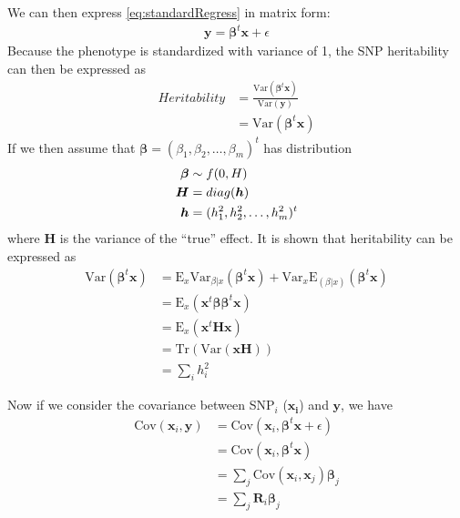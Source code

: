 			We can then express \cref{eq:standardRegress} in matrix form:
			\begin{align}
				\boldsymbol{y}=\boldsymbol{\beta}^t\boldsymbol{x}+\epsilon
				\label{eq:matrixRegress}
			\end{align}
			Because the phenotype is standardized with variance of 1, the \gls{SNP} heritability can then be expressed as
			\begin{align}
				Heritability& = \frac{\mathrm{Var}(\boldsymbol{\beta}^t\boldsymbol{x})}{\mathrm{Var}(\boldsymbol{y})} \nonumber\\
				&=\mathrm{Var}(\boldsymbol{\beta}^t\boldsymbol{x})
			\end{align}
			If we then assume that $\boldsymbol{\beta} = (\beta_1, \beta_2,\dots,\beta_m)^t$ has distribution
			\begin{align*}
				\boldsymbol{\beta}&\sim f(0,\boldmath{H})\\
				\boldsymbol{H}&=diag(\boldsymbol{h})\\
				\boldsymbol{h}&=(h_1^2,h_2^2,\dots,h_m^2)^t
			\end{align*}
			where $\boldsymbol{H}$ is the variance of the ``true'' effect. 
			It is shown that heritability can be expressed as %
			\begin{align}
			\mathrm{Var}(\boldsymbol{\beta}^t\boldsymbol{x}) &= \mathrm{E}_x\mathrm{Var}_{\beta|x}(\boldsymbol{\beta}^t\boldsymbol{x})+\mathrm{Var}_x\mathrm{E}_{(\beta|x)}(\boldsymbol{\beta}^t\boldsymbol{x}) \nonumber\\
			&=\mathrm{E}_x(\boldsymbol{x}^t\boldsymbol{\beta\beta}^t\boldsymbol{x}) \nonumber\\ 
			&= \mathrm{E}_x(\boldsymbol{x}^t\boldsymbol{Hx}) \nonumber\\
			&=\mathrm{Tr}(\mathrm{Var}(\boldsymbol{x}\boldsymbol{H})) \nonumber\\
			&=\sum_ih_i^2
			\label{eq:proveHerit}
			\end{align}
			
			Now if we consider the covariance between \gls{SNP}$_i$ ($\boldsymbol{x_i}$) and $\boldsymbol{y}$, we have
			\begin{align}
			 \mathrm{Cov}(\boldsymbol{x}_i,\boldsymbol{y}) &= \mathrm{Cov}(\boldsymbol{x}_i,\boldsymbol{\beta}^t\boldsymbol{x}+\epsilon) \nonumber\\
			 &=\mathrm{Cov}(\boldsymbol{x}_i,\boldsymbol{\beta}^t\boldsymbol{x}) \nonumber\\
			 &=\sum_j{\mathrm{Cov}(\boldsymbol{x}_i,\boldsymbol{x}_j)\boldsymbol{\beta}_j} \nonumber\\
			 &=\sum_j{\boldsymbol{R}_i\boldsymbol{\beta}_j}
			 \label{eq:covPhenoTrue}
			\end{align}
			
